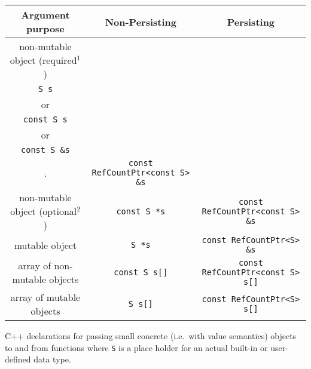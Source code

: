 \documentclass[pdf,ps2pdf,11pt]{SANDreport}
\begin{document}
%
\begin{center}
\begin{minipage}{{}\textwidth}
\begin{tabular}{|c|c|c|}
\hline
Argument purpose
& Non-Persisting
& Persisting \\
\hline
\hline
non-mutable object (required$^1$)
& \begin{minipage}{12ex}
    \begin{center}
    {\tiny .}\\
    {}\texttt{S s} \\
    or \\
    {}\texttt{const S s} \\
    or \\
    {}\texttt{const S \&s} \\
    {\tiny .}
    \end{center}
  \end{minipage}
& {}\texttt{const RefCountPtr<const S> \&s} \\
\hline
non-mutable object (optional$^2$)
& {}\texttt{const S *s}
& {}\texttt{const RefCountPtr<const S> \&s} \\
\hline
mutable object
& {}\texttt{S *s}
& {}\texttt{const RefCountPtr<S> \&s} \\
\hline
array of non-mutable objects
& {}\texttt{const S s[]}
& {}\texttt{const RefCountPtr<const S> s[]} \\
\hline
array of mutable objects
& {}\texttt{S s[]}
& {}\texttt{const RefCountPtr<S> s[]} \\
\hline
\end{tabular}
\begin{center}
C++ declarations for passing small concrete (i.e.~with value
semantics) objects to and from functions where {}\texttt{S} is a place
holder for an actual built-in or user-defined data type.
\end{center}
\end{minipage}
\end{center}
%
%
\end{document}
